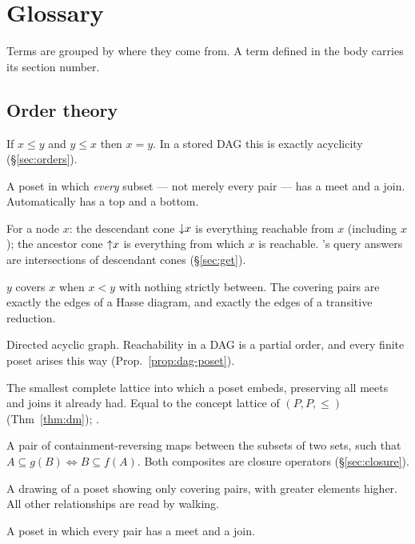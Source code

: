 \section{Glossary}
\label{sec:glossary}

Terms are grouped by where they come from. A term defined in the body carries
its section number.

\subsection*{Order theory}

\begin{description}[leftmargin=0pt,labelindent=0pt,style=nextline,
                    font=\normalfont\bfseries]
\item[Antisymmetry] If $x \leq y$ and $y \leq x$ then $x = y$. In a stored DAG
  this is exactly acyclicity (\S\ref{sec:orders}).
\item[Complete lattice] A poset in which \emph{every} subset --- not merely
  every pair --- has a meet and a join. Automatically has a top and a bottom.
\item[Cone] For a node $x$: the descendant cone $\mathord{\downarrow}x$ is everything
  reachable from $x$ (including $x$); the ancestor cone $\mathord{\uparrow}x$ is everything
  from which $x$ is reachable. \odag{}'s query answers are intersections of
  descendant cones (\S\ref{sec:get}).
\item[Cover] $y$ covers $x$ when $x < y$ with nothing strictly between. The
  covering pairs are exactly the edges of a Hasse diagram, and exactly the
  edges of a transitive reduction.
\item[DAG] Directed acyclic graph. Reachability in a DAG is a partial order,
  and every finite poset arises this way (Prop.~\ref{prop:dag-poset}).
\item[Dedekind--MacNeille completion] The smallest complete lattice into which
  a poset embeds, preserving all meets and joins it already had. Equal to the
  concept lattice of $(P,P,\leq)$ (Thm~\ref{thm:dm}); \citet{macneille1937}.
\item[Galois connection] A pair of containment-reversing maps between the
  subsets of two sets, such that $A \subseteq g(B) \iff B \subseteq f(A)$.
  Both composites are closure operators (\S\ref{sec:closure}).
\item[Hasse diagram] A drawing of a poset showing only covering pairs, with
  greater elements higher. All other relationships are read by walking.
\item[Lattice] A poset in which every pair has a meet and a join.

\end{description}
